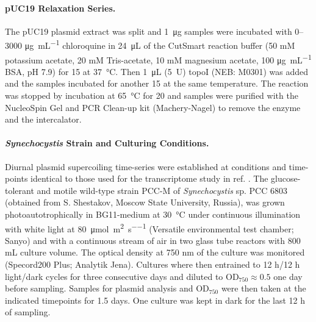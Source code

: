 \documentclass[10pt,a4]{article}
\def\cite#1{\hypersetup{citecolor=Teal}\citep{#1}} %
\newcommand{\photons}{\micro\mol\per\square\meter\per\second}
\newcommand{\ugml}{\micro\gram\per\milli\liter}
\newcommand{\scyst}{\textit{Synechocystis}}
\newcommand{\OD}{\ensuremath{\text{OD}_{750}}}
\begin{document}
\paragraph{pUC19 Relaxation Series.}
The pUC19 plasmid extract was split and \SI{1}{\ug} samples were
incubated with 0--3000 \si{\ugml} chloroquine in \SI{24}{\uL} of the
CutSmart reaction buffer (50 mM potassium acetate, 20 mM Tris-acetate,
10 mM magnesium acetate, 100 \si{\ugml} BSA, pH 7.9) for \SI{15}{\min}
at \SI{37}{\celsius}. Then \SI{1}{\uL} (\SI{5}{U}) topoI (NEB: M0301)
was added and the samples incubated for another \SI{15}{\min} at the
same temperature. The reaction was stopped by incubation at
\SI{65}{\celsius} for \SI{20}{\min} and samples were purified with the
NucleoSpin Gel and PCR Clean-up kit (Machery-Nagel) to remove the
enzyme and the intercalator.

\paragraph{\scyst{} Strain and Culturing Conditions.}
Diurnal plasmid supercoiling time-series were established at
conditions and time-points identical to those used for the
transcriptome study in ref. \cite{Lehmann2013, Beck2014}.  The
glucose-tolerant and motile wild-type strain PCC-M of
\textit{Synechocystis} sp. PCC 6803 (obtained from S.  Shestakov,
Moscow State University, Russia), was grown photoautotrophically in
BG11-medium at \SI{30}{\celsius} under continuous illumination with
white light at \SI{80}{\photons} (Versatile environmental test
chamber; Sanyo) and with a continuous stream of air in two 
glass tube reactors with 800 mL culture volume.  The optical
density at 750 nm of the culture was monitored (Specord200 Plus;
Analytik Jena). Cultures where then entrained to 12 h/12 h light/dark
cycles for three consecutive days and diluted to $\OD{}\approx 0.5$
one day before sampling. Samples for plasmid analysis and \OD{} were
then taken at the indicated timepoints for 1.5 days. One culture was
kept in dark for the last 12 h of sampling.
\end{document}
